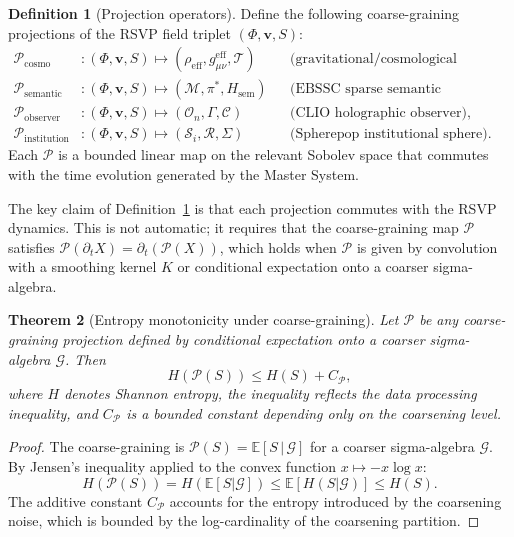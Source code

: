 \documentclass[12pt, a4paper]{article}
\theoremstyle{plain}
\newtheorem{theorem}{Theorem}[section]
\theoremstyle{definition}
\newtheorem{definition}[theorem]{Definition}
\theoremstyle{remark}
\newcommand{\vfield}{\mathbf{v}}
\newcommand{\Proj}[1]{\mathcal{P}_{#1}}
\begin{document}
\begin{definition}[Projection operators]
\label{def:projections}
Define the following coarse-graining projections of the RSVP field triplet
$(\Phi, \vfield, S)$:
\begin{align}
\Proj{\mathrm{cosmo}} &: (\Phi, \vfield, S) \mapsto (\rho_{\mathrm{eff}}, g_{\mu\nu}^{\mathrm{eff}}, \mathcal{T})
&&\text{(gravitational/cosmological observables),}\\
\Proj{\mathrm{semantic}} &: (\Phi, \vfield, S) \mapsto (\mathcal{M}, \pi^*, H_{\mathrm{sem}})
&&\text{(EBSSC sparse semantic manifold),}\\
\Proj{\mathrm{observer}} &: (\Phi, \vfield, S) \mapsto (\mathcal{O}_n, \Gamma, \mathcal{C})
&&\text{(CLIO holographic observer),}\\
\Proj{\mathrm{institution}} &: (\Phi, \vfield, S) \mapsto (\mathcal{S}_i, \mathcal{R}, \Sigma)
&&\text{(Spherepop institutional sphere).}
\end{align}
Each $\mathcal{P}$ is a bounded linear map on the relevant Sobolev space that commutes
with the time evolution generated by the Master System.
\end{definition}

The key claim of Definition~\ref{def:projections} is that each projection commutes with
the RSVP dynamics.  This is not automatic; it requires that the coarse-graining map
$\mathcal{P}$ satisfies $\mathcal{P}(\partial_t X) = \partial_t(\mathcal{P}(X))$,
which holds when $\mathcal{P}$ is given by convolution with a smoothing kernel $K$ or
conditional expectation onto a coarser sigma-algebra.

\begin{theorem}[Entropy monotonicity under coarse-graining]
\label{thm:entropymonotone}
Let $\mathcal{P}$ be any coarse-graining projection defined by conditional expectation
onto a coarser sigma-algebra $\mathcal{G}$.  Then
\[
H(\mathcal{P}(S)) \leq H(S) + C_{\mathcal{P}},
\]
where $H$ denotes Shannon entropy, the inequality reflects the data processing
inequality, and $C_{\mathcal{P}}$ is a bounded constant depending only on the
coarsening level.
\end{theorem}

\begin{proof}
The coarse-graining is $\mathcal{P}(S) = \mathbb{E}[S\,|\,\mathcal{G}]$ for a coarser
sigma-algebra $\mathcal{G}$.  By Jensen's inequality applied to the convex function
$x\mapsto -x\log x$:
\[
H(\mathcal{P}(S)) = H(\mathbb{E}[S|\mathcal{G}]) \leq \mathbb{E}[H(S|\mathcal{G})] \leq H(S).
\]
The additive constant $C_{\mathcal{P}}$ accounts for the entropy introduced by the
coarsening noise, which is bounded by the log-cardinality of the coarsening partition.
\end{proof}
\end{document}
